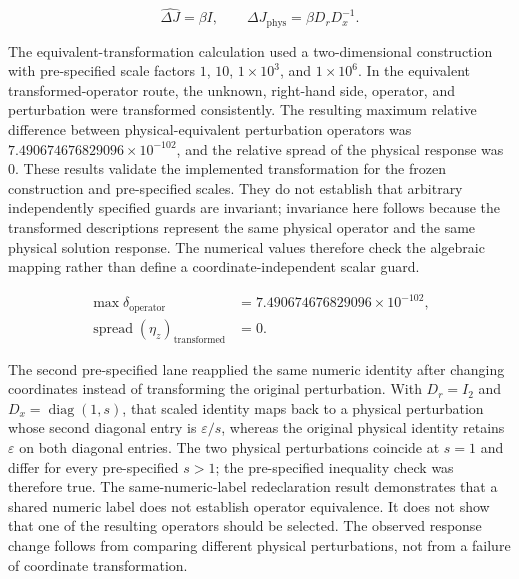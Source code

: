 \documentclass[preprint,12pt]{elsarticle}
\begin{document}
\begin{linenomath*}
\begin{equation}
\widehat{\Delta J}=\beta I,
\qquad \Delta J_{\mathrm{phys}}=\beta D_rD_x^{-1}.
\label{eq:scaled_identity_mapping}
\end{equation}
\end{linenomath*}

The equivalent-transformation calculation used a two-dimensional construction with pre-specified scale factors $1$, $10$, $1\allowbreak\times10^{3}$, and $1\allowbreak\times10^{6}$. In the equivalent transformed-operator route, the unknown, right-hand side, operator, and perturbation were transformed consistently. The resulting maximum relative difference between physical-equivalent perturbation operators was $7.490674676829096\allowbreak\times10^{-102}$, and the relative spread of the physical response was $0$. These results validate the implemented transformation for the frozen construction and pre-specified scales. They do not establish that arbitrary independently specified guards are invariant; invariance here follows because the transformed descriptions represent the same physical operator and the same physical solution response. The numerical values therefore check the algebraic mapping rather than define a coordinate-independent scalar guard.

\begin{linenomath*}
\begin{equation}
\begin{aligned}
\max \delta_{\mathrm{operator}} &= 7.490674676829096\times10^{-102},\\
\operatorname{spread}(\eta_z)_{\mathrm{transformed}} &= 0.
\end{aligned}
\label{eq:p3_reproduction_accuracy}
\end{equation}
\end{linenomath*}

The second pre-specified lane reapplied the same numeric identity after changing coordinates instead of transforming the original perturbation. With $D_r=I_2$ and $D_x=\operatorname{diag}(1,s)$, that scaled identity maps back to a physical perturbation whose second diagonal entry is $\varepsilon/s$, whereas the original physical identity retains $\varepsilon$ on both diagonal entries. The two physical perturbations coincide at $s=1$ and differ for every pre-specified $s>1$; the pre-specified inequality check was therefore true. The same-numeric-label redeclaration result demonstrates that a shared numeric label does not establish operator equivalence. It does not show that one of the resulting operators should be selected. The observed response change follows from comparing different physical perturbations, not from a failure of coordinate transformation.
\end{document}
